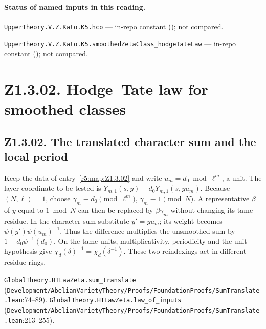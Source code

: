 
\paragraph{Status of named inputs in this reading.}
\noindent\nolinkurl{UpperTheory.V.Z.Kato.K5.hco} --- in-repo constant (); not compared.\par
\noindent\nolinkurl{UpperTheory.V.Z.Kato.K5.smoothedZetaClass_hodgeTateLaw} --- in-repo constant (); not compared.\par

\section*{Z1.3.02. Hodge--Tate law for smoothed classes}

\subsection{Z1.3.02. The translated character sum and the local period}\label{r6:Z1.3.02}
Keep the data of entry~\ref{r5:map:Z1.3.02} and write $u_m=d_0\bmod\ell^m$, a unit. The layer coordinate to be tested is $Y_{m,1}(s,y)-d_0Y_{m,1}(s,yu_m)$. Because $(N,\ell)=1$, choose $\gamma_m\equiv d_0\pmod{\ell^m}$, $\gamma_m\equiv1\pmod N$. A representative $\beta$ of $y$ equal to $1\bmod N$ can then be replaced by $\beta\gamma_m$ without changing its tame residue. In the character sum substitute $y'=yu_m$; its weight becomes $\psi(y')\psi(u_m)^{-1}$. Thus the difference multiplies the unsmoothed sum by $1-d_0\psi^{-1}(d_0)$. On the tame units, multiplicativity, periodicity and the unit hypothesis give $\chi_d(\delta)^{-1}=\chi_d(\delta^{-1})$. These two reindexings act in different residue rings.
\par{\footnotesize \nolinkurl{GlobalTheory.HTLawZeta.sum_translate} (\nolinkurl{Development/AbelianVarietyTheory/Proofs/FoundationProofs/SumTranslate.lean}\allowbreak:74--89). \nolinkurl{GlobalTheory.HTLawZeta.law_of_inputs} (\nolinkurl{Development/AbelianVarietyTheory/Proofs/FoundationProofs/SumTranslate.lean}\allowbreak:213--255).\par}

